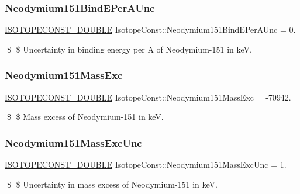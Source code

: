 \subsubsection{\texorpdfstring{Neodymium151\+Bind\+E\+Per\+A\+Unc}{Neodymium151BindEPerAUnc}}
{\footnotesize\ttfamily \mbox{\hyperlink{group___isotope_const-_macros_ga8f45a7272ce02c0b4c65c44636ed719a}{I\+S\+O\+T\+O\+P\+E\+C\+O\+N\+S\+T\+\_\+\+D\+O\+U\+B\+LE}} Isotope\+Const\+::\+Neodymium151\+Bind\+E\+Per\+A\+Unc = 0.}

\$ \$ Uncertainty in binding energy per A of Neodymium-\/151 in keV. \mbox{\label{group___isotope_const-_neodymium-_nd151_gaa534675c3f96d9f74f1487b06fa54bfd}} 
\subsubsection{\texorpdfstring{Neodymium151\+Mass\+Exc}{Neodymium151MassExc}}
{\footnotesize\ttfamily \mbox{\hyperlink{group___isotope_const-_macros_ga8f45a7272ce02c0b4c65c44636ed719a}{I\+S\+O\+T\+O\+P\+E\+C\+O\+N\+S\+T\+\_\+\+D\+O\+U\+B\+LE}} Isotope\+Const\+::\+Neodymium151\+Mass\+Exc = -\/70942.}

\$ \$ Mass excess of Neodymium-\/151 in keV. \mbox{\label{group___isotope_const-_neodymium-_nd151_gac0ad94b4927fdc5de726658edfedf532}} 
\subsubsection{\texorpdfstring{Neodymium151\+Mass\+Exc\+Unc}{Neodymium151MassExcUnc}}
{\footnotesize\ttfamily \mbox{\hyperlink{group___isotope_const-_macros_ga8f45a7272ce02c0b4c65c44636ed719a}{I\+S\+O\+T\+O\+P\+E\+C\+O\+N\+S\+T\+\_\+\+D\+O\+U\+B\+LE}} Isotope\+Const\+::\+Neodymium151\+Mass\+Exc\+Unc = 1.}

\$ \$ Uncertainty in mass excess of Neodymium-\/151 in keV. \mbox{\label{group___isotope_const-_neodymium-_nd151_ga7de686713cfc7c0728ae1af4347cc160}} 
